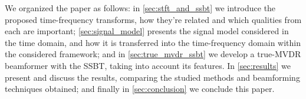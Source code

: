We organized the paper as follows:
in \cref{sec:stft_and_ssbt} we introduce the proposed time-frequency transforms, how they're related and which qualities from each are important;
\cref{sec:signal_model} presents the signal model considered in the time domain, and how it is transferred into the time-frequency domain within the considered framework;
and in \cref{sec:true_mvdr_ssbt} we develop a true-MVDR beamformer with the SSBT, taking into account its features. In \cref{sec:results} we present and discuss the results, comparing the studied methods and beamforming techniques obtained; and finally in \cref{sec:conclusion} we conclude this paper.

%
